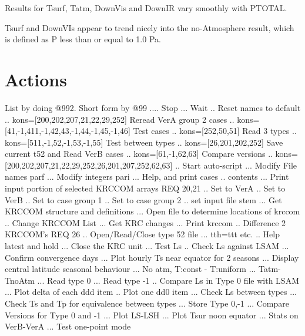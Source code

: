 \documentclass{article}  %
\begin{document}
Results for Tsurf, Tatm, DownVis and DownIR vary smoothly with PTOTAL.

Tsurf and DownVIs appear to trend nicely into the no-Atmosphere result, which is
defined as P less than or equal to 1.0 Pa.

   

\appendix  %

\section{Actions} %
List by doing  @992.  Short form by @99
\qi {}.... Stop
\qi {}...  Wait
\qi {}.. Reset names to default
\qi {}.. kons=[200,202,207,21,22,29,252] Reread VerA group 2 cases
\qi {}.. kons=[41,-1,411,-1,42,43,-1,44,-1,45,-1,46] Test cases
\qi {}.. kons=[252,50,51] Read 3 types 
\qi {}.. kons=[511,-1,52,-1,53,-1,55] Test between types
\qi {}.. kons=[26,201,202,252] Save current t52 and Read VerB cases
\qi {}.. kons=[61,-1,62,63] Compare versions
\qi {}.. kons=[200,202,207,21,22,29,252,26,201,207,252,62,63]
\qi {}.. Start auto-script 
\qi {}... Modify File names parf
\qi {}... Modify integers pari
\qi {}... Help, and print cases
\qi {}.. contents
\qi {}... Print input portion of selected KRCCOM arrays REQ 20,21
\qi {}.. Set to VerA 
\qi {}.. Set to VerB
\qi {}.. Set to case group 1
\qi {}.. Set to case group 2
\qi {}.. set input file stem
\qi {}... Get KRCCOM structure and definitions
\qi {}... Open file to determine locations of krccom
\qi {}.. Change KRCCOM List
\qi {}... Get KRC changes
\qi {}... Print krccom
\qi {}.. Difference 2 KRCCOM's  REQ 26
\qi {}.. Open/Read/Close type 52 file
\qi {}... tth=ttt etc.
\qi {}.. Help latest and hold
\qi {}... Close the KRC unit
\qi {}... Test Ls
\qi {}.. Check Ls against LSAM
\qi {}... Confirm convergence days
\qi {}... Plot hourly Ts near equator for 2 seasons
\qi {}... Display central latitude seasonal behaviour
\qi {}... No atm, T:const - T:uniform
\qi {}... Tatm-TnoAtm
\qi {}... Read type 0
\qi {}... Read type -1
\qi {}.. Compare Ls in Type 0 file with LSAM 
\qi {}... Plot delta  of each ddd item
\qi {}.. Plot one dd0 item
\qi {}... Check Ls between types
\qi {}... Check Ts and Tp for equivalence between types
\qi {}... Store Type 0,-1
\qi {}... Compare Versions for Type 0 and -1
\qi {}... Plot LS-LSH
\qi {}... Plot Tsur noon equator
\qi {}... Stats on VerB-VerA
\qi {}... Test one-point mode
\end{document}
